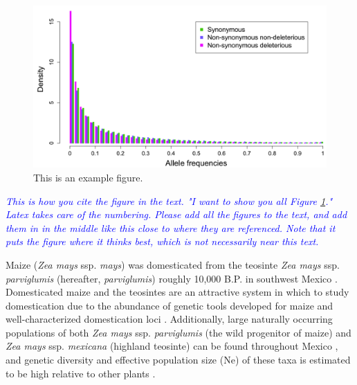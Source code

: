 \documentclass[12pt]{article}
\newcommand{\jri}[1]{\textcolor{blue}{ \emph{\scriptsize  #1}} }
\begin{document}
\begin{figure}[!t]
  \begin{center}
   \includegraphics[width=150mm]{SFS.png}
    \caption{This is an example figure.} 
\label{sfs_non_syn}
  \end{center}
\end{figure}

\jri{This is how you cite the figure in the text. "I want to show you all Figure \ref{sfs_non_syn}." Latex takes care of the numbering.  Please add all the figures to the text, and add them in in the middle like this close to where they are referenced. Note that it puts the figure where it thinks best, which is not necessarily near this text.}

Maize (\emph{Zea mays} ssp. \emph{mays}) was domesticated from the teosinte \emph{Zea mays} ssp. \emph{parviglumis} (hereafter, \emph{parviglumis}) roughly 10,000 B.P. in southwest Mexico \cite{Piperno et al 2009, Matsuoka et al 2002}. Domesticated maize and the teosintes are an attractive system in which to study domestication due to the abundance of genetic tools developed for maize and well-characterized domestication loci \cite{Hufford et al 2012a, Doebley 2004, Hufford et al 2012b}. Additionally, large naturally occurring populations of both \emph{Zea mays} ssp. \emph{parviglumis} (the wild progenitor of maize) and \emph{Zea mays} ssp. \emph{mexicana} (highland teosinte) can be found throughout Mexico \cite{Wilkes 1977, Hufford et al 2013}, and genetic diversity and effective population size (Ne) of these taxa is estimated to be high \cite{Ross-Ibarra et al 2009} relative to other plants \cite{Nybom 2004}.
\end{document}
